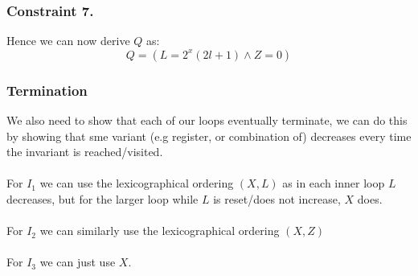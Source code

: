 \subsubsection*{Constraint 7.}
Hence we can now derive $Q$ as:
\[Q = (L = 2^x(2l + 1) \land Z = 0)\]

\subsubsection*{Termination}
We also need to show that each of our loops eventually terminate, we can do this by showing that sme variant (e.g register, or combination of) decreases every time the invariant is reached/visited.
\\
\\ For $I_1$ we can use the lexicographical ordering $(X,L)$ as in each inner loop $L$ decreases, but for the larger loop while $L$ is reset/does not increase, $X$ does.
\\
\\ For $I_2$ we can similarly use the lexicographical ordering $(X,Z)$
\\
\\ For $I_3$ we can just use $X$.


